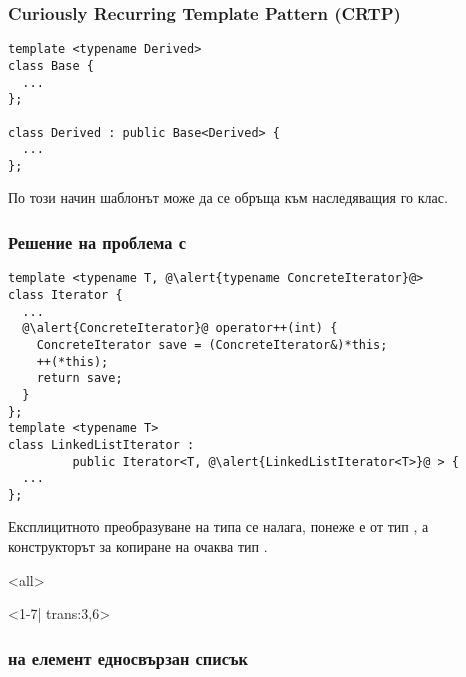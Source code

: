 \documentclass[alsotrans]{beamerswitch}
\begin{document}
\begin{frame}[fragile]
  \frametitle{Curiously Recurring Template Pattern (CRTP)}

\begin{lstlisting}
template <typename Derived>
class Base {
  ...
};

class Derived : public Base<Derived> {
  ...
};
\end{lstlisting}
  По този начин шаблонът  може да се обръща към наследяващия го клас.
\end{frame}

\begin{frame}[fragile]
  \frametitle{Решение на проблема с }

  \small
\begin{lstlisting}
template <typename T, @\alert{typename ConcreteIterator}@>
class Iterator {
  ...
  @\alert{ConcreteIterator}@ operator++(int) {
    ConcreteIterator save = (ConcreteIterator&)*this;
    ++(*this);
    return save;
  }
};
template <typename T>
class LinkedListIterator :
         public Iterator<T, @\alert{LinkedListIterator<T>}@ > {
  ...
};
\end{lstlisting}
\pause
Експлицитното преобразуване на типа се налага, понеже  е от тип , а конструкторът за копиране на  очаква тип .
\end{frame}

\mode
<all>

\begin{frame}<1-7| trans:3,6>
  \frametitle{ на елемент  едносвързан списък}

  \begin{center}
  \end{center}
\end{frame}
\end{document}
